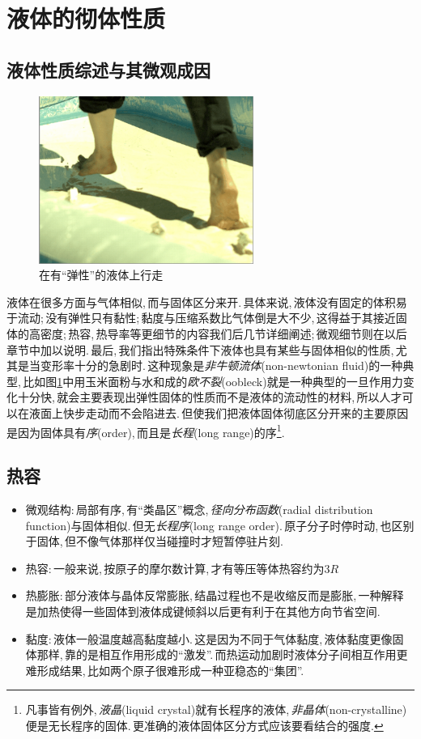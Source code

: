 \section{液体的彻体性质}

\subsection{液体性质综述与其微观成因}

\begin{figure}
\centering
\includegraphics[width=7cm]{image/5-3-1.png}
\caption{在有``弹性''的液体上行走}\label{fig:oobleck}
\end{figure}
液体在很多方面与气体相似,\,而与固体区分来开.\,具体来说,\,液体没有固定的体积易于流动;\,没有弹性只有黏性;\,黏度与压缩系数比气体倒是大不少,\,这得益于其接近固体的高密度;\,热容,\,热导率等更细节的内容我们后几节详细阐述;\,微观细节则在以后章节中加以说明.\,最后,\,我们指出特殊条件下液体也具有某些与固体相似的性质,\,尤其是当变形率十分的急剧时.\,这种现象是\emph{非牛顿流体}(non-newtonian fluid)的一种典型,\,比如图\ref{fig:oobleck}中用玉米面粉与水和成的\emph{欧不裂}(oobleck)就是一种典型的一旦作用力变化十分快,\,就会主要表现出弹性固体的性质而不是液体的流动性的材料,\,所以人才可以在液面上快步走动而不会陷进去.\,但使我们把液体固体彻底区分开来的主要原因是因为固体具有\emph{序}(order),\,而且是\emph{长程}(long range)的序\footnote{凡事皆有例外,\,\emph{液晶}(liquid crystal)就有长程序的液体,\,\emph{非晶体}(non-crystalline)便是无长程序的固体.\,更准确的液体固体区分方式应该要看结合的强度.}.

\subsection{热容}


\begin{itemize}
	\item 微观结构:\,局部有序,\,有``类晶区''概念,\,\emph{径向分布函数}(radial distribution function)与固体相似.\,但无\emph{长程序}(long range order).\,原子分子时停时动,\,也区别于固体,\,但不像气体那样仅当碰撞时才短暂停驻片刻.
	\item 热容:\,一般来说,\,按原子的摩尔数计算,\,才有等压等体热容约为$3R$
	\item 热膨胀:\,部分液体与晶体反常膨胀,\,结晶过程也不是收缩反而是膨胀,\,一种解释是加热使得一些固体到液体成键倾斜以后更有利于在其他方向节省空间.
	\item 黏度:\,液体一般温度越高黏度越小.\,这是因为不同于气体黏度,\,液体黏度更像固体那样,\,靠的是相互作用形成的``激发''.\,而热运动加剧时液体分子间相互作用更难形成结果,\,比如两个原子很难形成一种亚稳态的``集团''.
\end{itemize}




